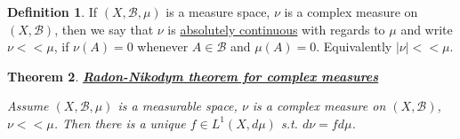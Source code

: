 \documentclass{article}
\newtheorem{theorem}{Theorem}[section]
\theoremstyle{definition}
\newtheorem{definition}[theorem]{Definition}
\newcommand{\B}{\mathscr{B}}
\begin{document}
\begin{definition}
    If $(X,\B,\mu)$ is a measure space, $\nu$ is a complex measure on $(X,\B)$, then we say that $\nu$ is \underline{absolutely continuous} with regards to $\mu$
    and write $\nu<<\mu$, if $\nu(A)=0$ whenever $A\in\B$ and $\mu(A)=0$. Equivalently $|\nu|<<\mu$.
\end{definition}

\begin{theorem}\underline{\textbf{Radon-Nikodym theorem for complex measures}}

    Assume $(X,\B,\mu)$ is a measurable space, $\nu$ is a complex measure on $(X,\B)$, $\nu<<\mu$. Then there 
    is a unique $f\in L^1(X,d\mu)$ s.t. $d\nu = fd\mu$.
\end{theorem}
\end{document}
